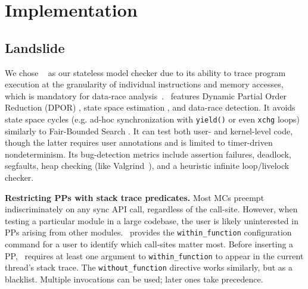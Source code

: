 

\section{Implementation}

\subsection{Landslide}
\label{sec:landslide}

We chose \landslide~\cite{landslide} as our stateless model checker due to its ability to trace program execution at the granularity of individual instructions and memory accesses, which is mandatory for data-race analysis~\cite{eraser}.
\landslide~features Dynamic Partial Order Reduction (DPOR) \cite{dpor}, state space estimation \cite{estimation}, and data-race detection.
It avoids state space cycles (e.g. ad-hoc synchronization with {\tt yield()} or even {\tt xchg} loops) similarly to Fair-Bounded Search \cite{bpor}. %
It can test both user- and kernel-level code, though the latter requires user annotations and is limited to timer-driven nondeterminism.
Its bug-detection metrics include assertion failures, deadlock, segfaults, heap checking (like Valgrind~\cite{valgrind}), and a heuristic infinite loop/livelock checker.

{\bf Restricting PPs with stack trace predicates.}
Most MCs preempt indiscriminately on any sync API call, regardless of the call-site.
However, when testing a particular module in a large codebase,
the user is likely uninterested in PPs arising from other modules.
\landslide~provides the {\tt within\_function} configuration command for a user to identify which call-sites matter most.
Before inserting a PP, \landslide~requires at least one argument to {\tt within\_function} to appear in the current thread's stack trace.
The {\tt without\_function} directive works similarly, but as a blacklist.
Multiple invocations can be used; later ones take precedence.

